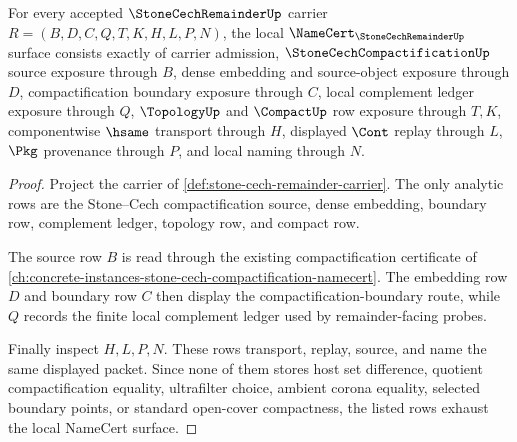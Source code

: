 \begin{theorem}
\label{thm:stone-cech-remainder-namecert-obligations}
For every accepted $\StoneCechRemainderUp$ carrier $R=(B,D,C,Q,T,K,H,L,P,N)$, the local $\NameCert_{\StoneCechRemainderUp}$ surface consists exactly of carrier admission, $\StoneCechCompactificationUp$ source exposure through $B$, dense embedding and source-object exposure through $D$, compactification boundary exposure through $C$, local complement ledger exposure through $Q$, $\TopologyUp$ and $\CompactUp$ row exposure through $T,K$, componentwise $\hsame$ transport through $H$, displayed $\Cont$ replay through $L$, $\Pkg$ provenance through $P$, and local naming through $N$.
\end{theorem}
\begin{proof}
Project the carrier of \autoref{def:stone-cech-remainder-carrier}. The only analytic rows are the Stone--Cech compactification source, dense embedding, boundary row, complement ledger, topology row, and compact row.

The source row $B$ is read through the existing compactification certificate of \autoref{ch:concrete-instances-stone-cech-compactification-namecert}. The embedding row $D$ and boundary row $C$ then display the compactification-boundary route, while $Q$ records the finite local complement ledger used by remainder-facing probes.

Finally inspect $H,L,P,N$. These rows transport, replay, source, and name the same displayed packet. Since none of them stores host set difference, quotient compactification equality, ultrafilter choice, ambient corona equality, selected boundary points, or standard open-cover compactness, the listed rows exhaust the local NameCert surface.
\end{proof}

